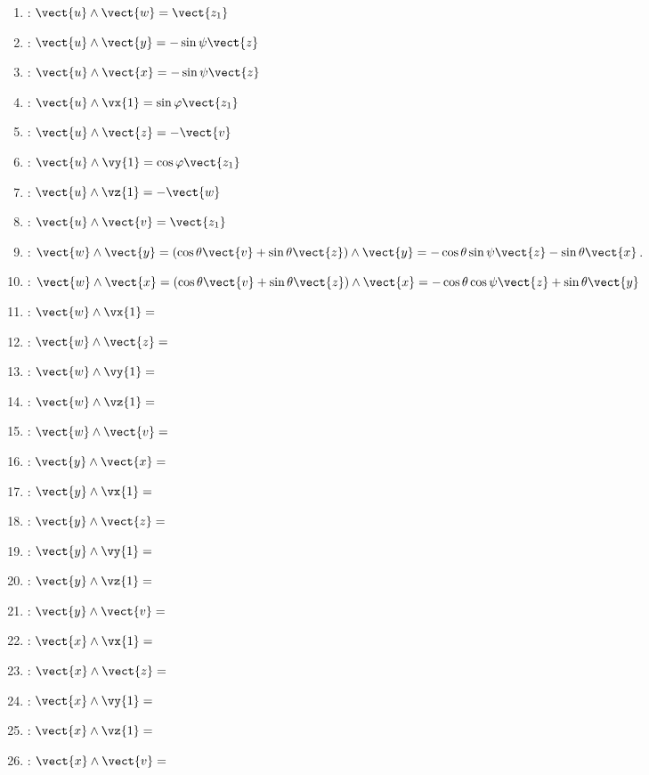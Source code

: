 \begin{corrigebox}
\begin{enumerate}
\item : $\vect{u}\wedge\vect{w} = \vect{z_1}$
\item : $\vect{u}\wedge\vect{y} = -\sin\psi \vect{z}$
\item : $\vect{u}\wedge\vect{x} = -\sin\psi \vect{z}$
\item : $\vect{u}\wedge\vx{1} = \sin\varphi \vect{z_1}$
\item : $\vect{u}\wedge\vect{z} = -\vect{v}$
\item : $\vect{u}\wedge\vy{1} =  \cos\varphi \vect{z_1}$
\item : $\vect{u}\wedge\vz{1} = -\vect{w}$
\item : $\vect{u}\wedge\vect{v} = \vect{z_1}$
\item : $\vect{w}\wedge\vect{y} = \left( \cos\theta \vect{v}+\sin\theta \vect{z}\right)\wedge\vect{y} = -\cos\theta  \sin \psi \vect{z}-\sin\theta \vect{x}$.
\item : $\vect{w}\wedge\vect{x} =\left( \cos\theta \vect{v}+\sin\theta \vect{z}\right)\wedge\vect{x} = -\cos\theta\cos\psi \vect{z}+\sin\theta \vect{y}$
\item : $\vect{w}\wedge\vx{1} = $
\item : $\vect{w}\wedge\vect{z} = $
\item : $\vect{w}\wedge\vy{1} = $
\item : $\vect{w}\wedge\vz{1} = $
\item : $\vect{w}\wedge\vect{v} = $
\item : $\vect{y}\wedge\vect{x} = $
\item : $\vect{y}\wedge\vx{1} = $
\item : $\vect{y}\wedge\vect{z} = $
\item : $\vect{y}\wedge\vy{1} = $
\item : $\vect{y}\wedge\vz{1} = $
\item : $\vect{y}\wedge\vect{v} = $
\item : $\vect{x}\wedge\vx{1} = $
\item : $\vect{x}\wedge\vect{z} = $
\item : $\vect{x}\wedge\vy{1} = $
\item : $\vect{x}\wedge\vz{1} = $
\item : $\vect{x}\wedge\vect{v} = $

\end{enumerate}
\end{corrigebox}
